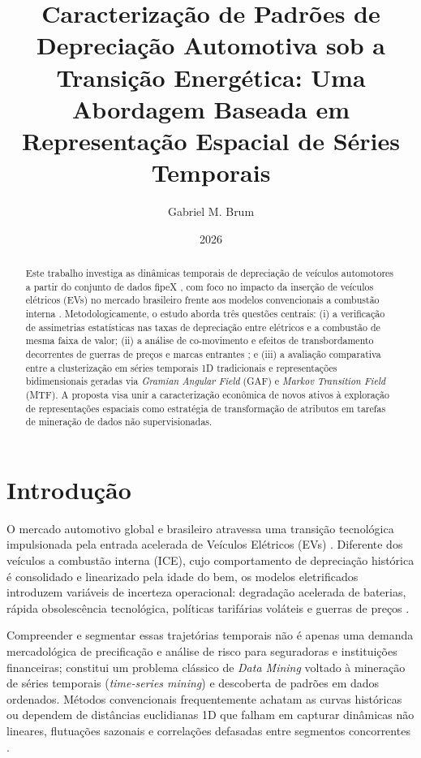 \documentclass{article}
\title{Caracterização de Padrões de Depreciação Automotiva sob a Transição Energética: Uma Abordagem Baseada em Representação Espacial de Séries Temporais}
\author{Gabriel M. Brum}
\date{2026}
\begin{document}
\maketitle

\begin{abstract}
Este trabalho investiga as dinâmicas temporais de depreciação de veículos automotores a partir do conjunto de dados fipeX , com foco no impacto da inserção de veículos elétricos (EVs) no mercado brasileiro frente aos modelos convencionais a combustão interna . Metodologicamente, o estudo aborda três questões centrais: (i) a verificação de assimetrias estatísticas nas taxas de depreciação entre elétricos e a combustão de mesma faixa de valor; (ii) a análise de co-movimento e efeitos de transbordamento decorrentes de guerras de preços e marcas entrantes ; e (iii) a avaliação comparativa entre a clusterização em séries temporais 1D tradicionais e representações bidimensionais geradas via \textit{Gramian Angular Field} (GAF) e \textit{Markov Transition Field} (MTF). A proposta visa unir a caracterização econômica de novos ativos à exploração de representações espaciais como estratégia de transformação de atributos em tarefas de mineração de dados não supervisionadas.
\end{abstract}

\section{Introdução}

O mercado automotivo global e brasileiro atravessa uma transição tecnológica impulsionada pela entrada acelerada de Veículos Elétricos (EVs) \cite{alvarez2024modelagem}. Diferente dos veículos a combustão interna (ICE), cujo comportamento de depreciação histórica é consolidado e linearizado pela idade do bem, os modelos eletrificados introduzem variáveis de incerteza operacional: degradação acelerada de baterias, rápida obsolescência tecnológica, políticas tarifárias voláteis e guerras de preços \cite{gautam2024depreciation, li2026global}.

Compreender e segmentar essas trajetórias temporais não é apenas uma demanda mercadológica de precificação e análise de risco para seguradoras e instituições financeiras; constitui um problema clássico de \textit{Data Mining} voltado à mineração de séries temporais (\textit{time-series mining}) e descoberta de padrões em dados ordenados. Métodos convencionais frequentemente achatam as curvas históricas ou dependem de distâncias euclidianas 1D que falham em capturar dinâmicas não lineares, flutuações sazonais e correlações defasadas entre segmentos concorrentes \cite{schloter2022empirical}.
\end{document}
